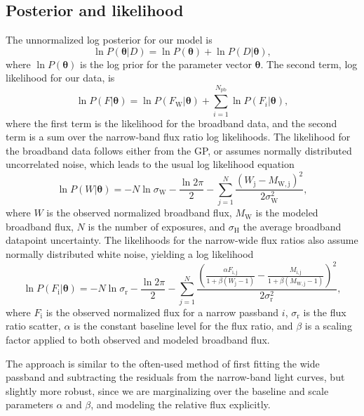 \documentclass[useAMS,usenatbib]{mn2e}
\newcommand{\vect}[1]{\ensuremath{\bm{#1}}}
\newcommand{\pvec}{\ensuremath{\vect{\theta}}\xspace}
\begin{document}
\subsection{Posterior and likelihood}
\label{sec:analysis:posterior_and_likelihood}
The unnormalized log posterior for our model is
\begin{equation}
 \ln P(\pvec|D) = \ln P(\pvec) + \ln P(D|\pvec),
\end{equation}
where $\ln P(\pvec)$ is the log prior for the parameter vector $\pvec$. The second term, log likelihood for our data, is
\begin{equation}
 \ln P(F|\pvec) = \ln P(F_\mathrm{W}|\pvec) + \sum_{i=1}^{N_\mathrm{pb}} \ln P(F_i|\pvec), 
\label{eq:wasp_19b_logl}
\end{equation}
where the first term is the likelihood for the broadband data, and the second term is a sum over the narrow-band
flux ratio log likelihoods. The likelihood for the broadband data follows either from the GP, or assumes normally 
distributed uncorrelated noise, which leads to the usual log likelihood equation 
\begin{equation}
 \ln P(W|\pvec) = -N \ln \sigma_\mathrm{W} - \frac{\ln 2\pi}{2} - \sum_{j=1}^N \frac{\left(W_\mathrm{j} 
-M_\mathrm{W,j}\right )^2}{2\sigma_\mathrm{W}^2},
\end{equation}
where $W$ is the observed normalized broadband flux, $M_\mathrm{W}$ is the modeled broadband flux, $N$ is the number 
of exposures, and $\sigma_\mathrm{H}$ the average broadband datapoint uncertainty. The likelihoods for the narrow-wide 
flux ratios also assume normally distributed white noise, yielding a log likelihood 
\begin{equation}
 \ln P(F_\mathrm{i}|\pvec) = -N \ln \sigma_\mathrm{r} - \frac{\ln 2\pi}{2} - \sum_{j=1}^N 
\frac{\left(\frac{\alpha F_\mathrm{i,j}}{1+\beta\left(W_\mathrm{j}-1\right)} - 
\frac{M_\mathrm{i,j}}{1+\beta\left(M_\mathrm{W,j}-1\right)}\right )^2}{2\sigma_\mathrm{r}^2},
\label{eq:logl_relative_flux}
\end{equation}
where $F_\mathrm{i}$ is the observed normalized flux for a narrow passband $i$, $\sigma_\mathrm{r}$ is the flux ratio 
scatter, $\alpha$ is the constant baseline level for the flux ratio, and $\beta$ is a scaling factor applied to both 
observed and modeled broadband flux. 

The approach is similar to the often-used method of first fitting the wide passband and subtracting the residuals from 
the narrow-band light curves, but slightly more robust, since we are marginalizing over the baseline and scale 
parameters $\alpha$ and $\beta$, and modeling the relative flux explicitly.
\end{document}
